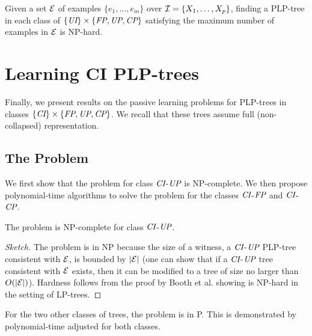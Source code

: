 \begin{cor}
\label{cor:UIFP_least}
Given a set $\mathcal{E}$ of examples $\{e_1,\ldots,e_m\}$ over 
$\mathcal{I}=\{X_1,\ldots,X_p\}$, finding a PLP-tree in each class of $\{\textit{UI}\} \times \{\textit{FP},\textit{UP},\textit{CP}\}$ 
satisfying the maximum number of examples in $\mathcal{E}$ is NP-hard.
\end{cor}

\section{Learning CI PLP-trees}
Finally, we present results on the passive learning problems for 
PLP-trees in classes $\{\textit{CI}\} \times \{\textit{FP},\textit{UP},\textit{CP}\}$. We recall that these
trees assume full (non-collapsed) representation.


\vspace{-0.1cm}
\subsection{The  Problem}

\vspace{-0.1cm}
We first show that the  problem for class $\textit{CI}$-$\textit{UP}$ is 
NP-complete. We then propose polynomial-time algorithms to solve the 
 problem
for the classes $\textit{CI}$-$\textit{FP}$ and $\textit{CI}$-$\textit{CP}$.

\begin{thm}
\label{thm:passlearn_CIUP}
	The  problem is NP-complete for class $\textit{CI}$-$\textit{UP}$.
\end{thm}
\begin{proof}[Sketch]
The problem is in NP because the size of a witness, 
a $\textit{CI}$-$\textit{UP}$ PLP-tree consistent with $\mathcal{E}$, is bounded by $|\mathcal{E}|$ (one
can show that if a $\textit{CI}$-$\textit{UP}$ tree consistent with $\mathcal{E}$ exists, then it can
be modified to a tree of size no larger than $O(|\mathcal{E}|)$).
	Hardness follows from the proof by Booth et al.  showing 
	 is NP-hard in the setting of LP-trees.
\end{proof}

For the two other classes of trees, the problem is in P. This is demonstrated 
by polynomial-time  adjusted for both classes.

